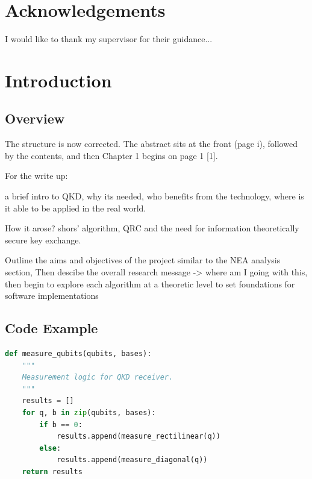 \documentclass[12pt, a4paper]{report}
\begin{document}
\clearpage
\chapter*{Acknowledgements}
I would like to thank my supervisor for their guidance...

\clearpage
\tableofcontents

\clearpage
\listoffigures
\listoftables
\lstlistoflistings %

\clearpage
{}

\chapter{Introduction}

\section{Overview}
The structure is now corrected. The abstract sits at the front (page i), followed by the contents, and then Chapter 1 begins on page 1 [1].



For the write up:

a brief intro to QKD, why its needed, who benefits from the technology, where is it able to be applied in the real world. 

How it arose? shors' algorithm, QRC and the need for information theoretically secure key exchange. 

Outline the aims and objectives of the project similar to the NEA analysis section, Then descibe the overall research message -> where am I going with this, then begin to explore each algorithm at a theoretic level to set foundations for software implementations
 
\section{Code Example}
\begin{lstlisting}[language=Python, caption={QKD Implementation}, label={lst:code}]
def measure_qubits(qubits, bases):
    """
    Measurement logic for QKD receiver.
    """
    results = []
    for q, b in zip(qubits, bases):
        if b == 0:
            results.append(measure_rectilinear(q))
        else:
            results.append(measure_diagonal(q))
    return results
\end{lstlisting}
\end{document}
